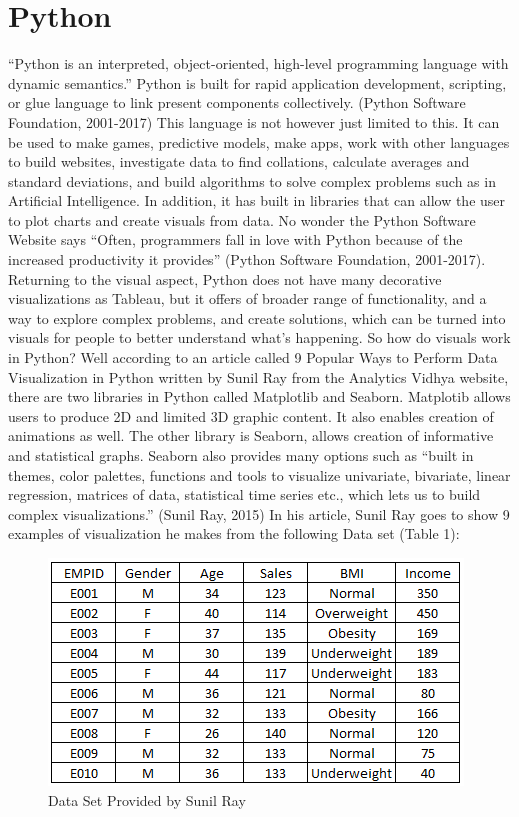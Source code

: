 \documentclass[sigconf]{acmart}
\begin{document}
\section{Python}
“Python is an interpreted, object-oriented, high-level programming language with dynamic semantics.” Python is built for rapid application development, scripting, or glue language to link present components collectively. (Python Software Foundation, 2001-2017) This language is not however just limited to this. It can be used to make games, predictive models, make apps, work with other languages to build websites, investigate data to find collations, calculate averages and standard deviations, and build algorithms to solve complex problems such as in Artificial Intelligence. In addition, it has built in libraries that can allow the user to plot charts and create visuals from data. No wonder the Python Software Website says “Often, programmers fall in love with Python because of the increased productivity it provides” (Python Software Foundation, 2001-2017). Returning to the visual aspect, Python does not have many decorative visualizations as Tableau, but it offers of broader range of functionality, and a way to explore complex problems, and create solutions, which can be turned into visuals for people to better understand what’s happening. 
So how do visuals work in Python? Well according to an article called 9 Popular Ways to Perform Data Visualization in Python written by Sunil Ray from the Analytics Vidhya website, there are two libraries in Python called Matplotlib and Seaborn. Matplotib allows users to produce 2D and limited 3D graphic content. It also enables creation of animations as well. The other library is Seaborn, allows creation of informative and statistical graphs. Seaborn also provides many options such as “built in themes, color palettes, functions and tools to visualize univariate, bivariate, linear regression, matrices of data, statistical time series etc., which lets us to build complex visualizations.” (Sunil Ray, 2015)
In his article, Sunil Ray goes to show 9 examples of visualization he makes from the following Data set (Table 1):

\begin{figure}[htb]
  \centering
  \includegraphics[width=1.0\columnwidth]{paper2/Table 1.png}
  \caption{Data Set Provided by Sunil Ray
  \cite{Sunil Ray }}
  \label{fig:Table 1} 
\end{figure}
\end{document}
